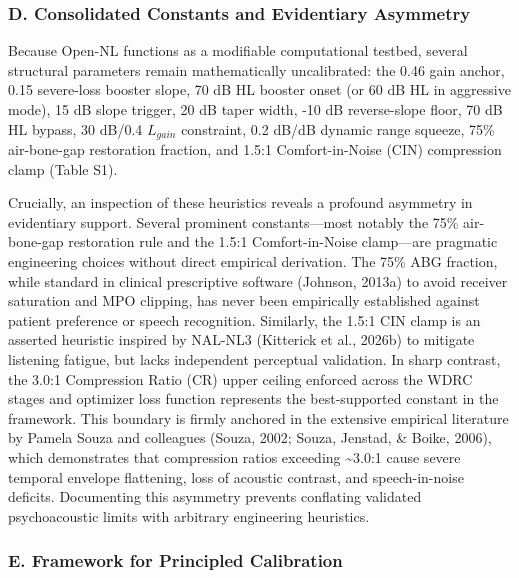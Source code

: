 \documentclass[
  12pt,
]{article}
\begin{document}
\subsubsection{D. Consolidated Constants and Evidentiary
Asymmetry}\label{d.-consolidated-constants-and-evidentiary-asymmetry}

Because Open-NL functions as a modifiable computational testbed, several
structural parameters remain mathematically uncalibrated: the 0.46 gain
anchor, 0.15 severe-loss booster slope, 70 dB HL booster onset (or 60 dB
HL in aggressive mode), 15 dB slope trigger, 20 dB taper width, -10 dB
reverse-slope floor, 70 dB HL bypass, 30 dB/0.4 \(L_{gain}\) constraint,
0.2 dB/dB dynamic range squeeze, 75\% air-bone-gap restoration fraction,
and 1.5:1 Comfort-in-Noise (CIN) compression clamp (Table S1).

Crucially, an inspection of these heuristics reveals a profound
asymmetry in evidentiary support. Several prominent constants---most
notably the 75\% air-bone-gap restoration rule and the 1.5:1
Comfort-in-Noise clamp---are pragmatic engineering choices without
direct empirical derivation. The 75\% ABG fraction, while standard in
clinical prescriptive software (Johnson, 2013a) to avoid receiver
saturation and MPO clipping, has never been empirically established
against patient preference or speech recognition. Similarly, the 1.5:1
CIN clamp is an asserted heuristic inspired by NAL-NL3 (Kitterick et
al., 2026b) to mitigate listening fatigue, but lacks independent
perceptual validation. In sharp contrast, the 3.0:1 Compression Ratio
(CR) upper ceiling enforced across the WDRC stages and optimizer loss
function represents the best-supported constant in the framework. This
boundary is firmly anchored in the extensive empirical literature by
Pamela Souza and colleagues (Souza, 2002; Souza, Jenstad, \& Boike,
2006), which demonstrates that compression ratios exceeding
\textasciitilde3.0:1 cause severe temporal envelope flattening, loss of
acoustic contrast, and speech-in-noise deficits. Documenting this
asymmetry prevents conflating validated psychoacoustic limits with
arbitrary engineering heuristics.

\subsubsection{E. Framework for Principled
Calibration}\label{e.-framework-for-principled-calibration}
\end{document}
